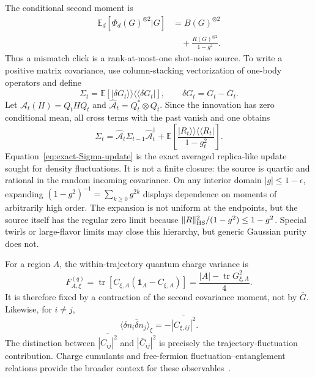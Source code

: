 \documentclass[
  aps,prx,twocolumn,superscriptaddress,longbibliography,
  nofootinbib,floatfix
]{revtex4-2}
\newcommand{\Id}{\mathbf{1}}
\newcommand{\tr}{\operatorname{tr}}
\newcommand{\E}{\mathbb{E}}
\newcommand{\avg}[1]{\overline{#1}}
\theoremstyle{plain}
\theoremstyle{definition}
\begin{document}
The conditional second moment is
\begin{equation}
 \boxed{\begin{aligned}
 \E_d[\Phi_d(G)^{\otimes2}|G]
 &=B(G)^{\otimes2}\\
 &\quad+\frac{R(G)^{\otimes2}}{1-g^2}.
 \end{aligned}}
 \label{eq:two-copy-covariance-identity}
\end{equation}
Thus a mismatch click is a rank-at-most-one shot-noise source.  To write a
positive matrix covariance, use column-stacking vectorization of one-body
operators and define
\begin{equation}
 \Sigma_t
 =\E\!\left[
 |\delta G_t\rangle\!\rangle
 \langle\!\langle\delta G_t|
 \right],
 \qquad
 \delta G_t=G_t-\avg G_t.
 \label{eq:Sigma-definition}
\end{equation}
Let \(\mathcal A_t(H)=Q_tHQ_t\) and
\(\widehat{\mathcal A}_t=Q_t^*\otimes Q_t\).  Since the innovation has zero
conditional mean, all cross terms with the past vanish and one obtains
\begin{equation}
 \boxed{
 \Sigma_t
 =\widehat{\mathcal A}_t\Sigma_{t-1}
  \widehat{\mathcal A}_t^\dagger
 +\E\!\left[
 \frac{|R_t\rangle\!\rangle\langle\!\langle R_t|}{1-g_t^2}
 \right].}
 \label{eq:exact-Sigma-update}
\end{equation}
Equation~\eqref{eq:exact-Sigma-update} is the exact averaged replica-like
update sought for density fluctuations.  It is not a finite closure: the
source is quartic and rational in the random incoming covariance.  On any
interior domain \(|g|\leq1-\epsilon\), expanding
\((1-g^2)^{-1}=\sum_{k\geq0}g^{2k}\) displays dependence on moments of
arbitrarily high order.  The expansion is not uniform at the endpoints, but
the source itself has the regular zero limit because
\(\|R\|_{\rm HS}^2/(1-g^2)\leq1-g^2\).  Special twirls or large-flavor limits
may close this hierarchy, but generic Gaussian purity does not.

For a region \(A\), the within-trajectory quantum charge variance is
\begin{equation}
 F_{A,\xi}^{(q)}
 =\tr[C_{\xi,A}(\Id_A-C_{\xi,A})]
 =\frac{|A|-\tr G_{\xi,A}^2}{4}.
 \label{eq:charge-variance-G}
\end{equation}
It is therefore fixed by a contraction of the second covariance moment, not
by \(\avg G\).  Likewise, for \(i\neq j\),
\begin{equation}
 \avg{\langle\delta n_i\delta n_j\rangle_\xi}
 =-\avg{|C_{\xi,ij}|^2}.
 \label{eq:density-correlation-square}
\end{equation}
The distinction between \(\avg{|C_{ij}|^2}\) and
\(|\avg C_{ij}|^2\) is precisely the trajectory-fluctuation contribution.
Charge cumulants and free-fermion fluctuation--entanglement relations provide
the broader context for these observables~\cite{KlichLevitov2009,SongFlindtRachel2011}.
\end{document}
